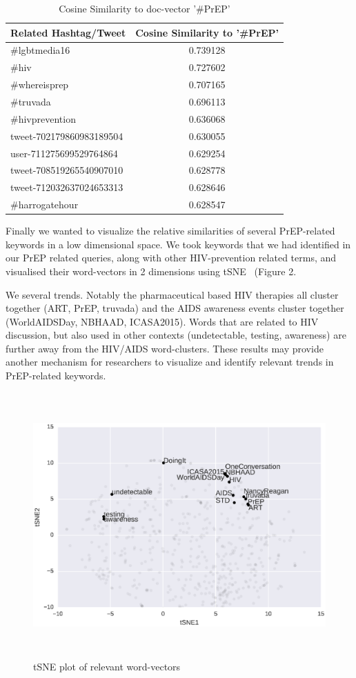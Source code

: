 \documentclass{sig-alternate-05-2015}
\begin{document}
\begin{table}
\centering
\caption{Cosine Similarity to doc-vector '\#PrEP'}
\begin{tabular}{|l|c|} \hline
Related Hashtag/Tweet & Cosine Similarity to '\#PrEP'\\ \hline
\#lgbtmedia16 & 0.739128\\ \hline
\#hiv & 	0.727602 \\ \hline
\#whereisprep & 0.707165 \\ \hline
\#truvada & 0.696113 \\ \hline
\#hivprevention & 0.636068 \\ \hline
tweet-702179860983189504 & 0.630055\\ \hline
user-711275699529764864 & 0.629254\\ \hline
tweet-708519265540907010 & 0.628778 \\ \hline
tweet-712032637024653313 & 0.628646 \\ \hline
\#harrogatehour & 0.628547 \\ \hline
\hline\end{tabular}
\end{table}

Finally we wanted to visualize the relative similarities of several PrEP-related keywords in a low dimensional space. We took keywords that we had identified in our PrEP related queries, along with other HIV-prevention related terms, and visualised their word-vectors in 2 dimensions using tSNE~\cite{van2008visualizing} (Figure 2.

We several trends. Notably the pharmaceutical based HIV therapies all cluster together (ART, PrEP, truvada) and the AIDS awareness events cluster together (WorldAIDSDay, NBHAAD, ICASA2015). Words that are related to HIV discussion, but also used in other contexts (undetectable, testing, awareness) are further away from the HIV/AIDS word-clusters. These results may provide another mechanism for researchers to visualize and identify relevant trends in PrEP-related keywords.

\begin{figure}
\centering
\includegraphics[height=4in, width=6in]{tSNE_word}
\caption{tSNE plot of relevant word-vectors}
\end{figure}
\end{document}
